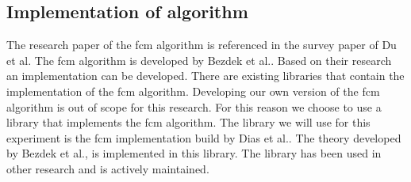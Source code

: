 \documentclass[../../main]{subfiles}
\begin{document}
\subsection{Implementation of algorithm}
The research paper of the \acrshort{fcm} algorithm is referenced in the survey paper of Du et al\cite{Du2010Clustering:Approach}.
The \acrshort{fcm} algorithm is developed by Bezdek et al.\cite{Bezdek1984FCM:Algorithm}.
Based on their research an implementation can be developed.
There are existing libraries that contain the implementation of the \acrshort{fcm} algorithm.
Developing our own version of the \acrshort{fcm} algorithm is out of scope for this research.
For this reason we choose to use a library that implements the \acrshort{fcm} algorithm.
The library we will use for this experiment is the \acrlong{fcm} implementation build by Dias et al.\cite{dias2019fuzzy}.
The theory developed by Bezdek et al., is implemented in this library.
The library has been used in other research\cite{DeAlmeidaNeto2020, Kopf2019, Nwadiugwu2020} and is actively maintained.
\end{document}
